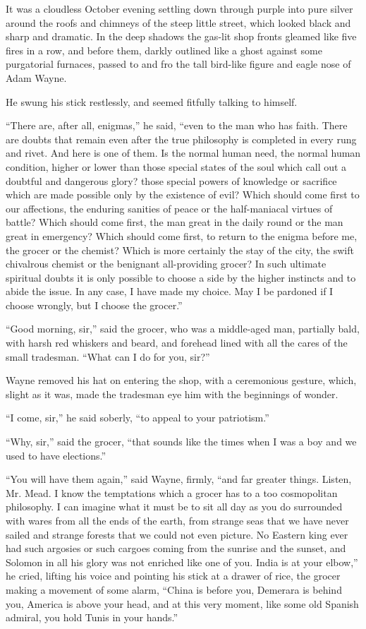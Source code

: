 \documentclass{book}
\begin{document}
It was a cloudless October evening settling down through purple into pure silver around the roofs and chimneys of the steep little street, which looked black and sharp and dramatic. In the deep shadows the gas-lit shop fronts gleamed like five fires in a row, and before them, darkly outlined like a ghost against some purgatorial furnaces, passed to and fro the tall bird-like figure and eagle nose of Adam Wayne.

He swung his stick restlessly, and seemed fitfully talking to himself.

“There are, after all, enigmas,” he said, “even to the man who has faith. There are doubts that remain even after the true philosophy is completed in every rung and rivet. And here is one of them. Is the normal human need, the normal human condition, higher or lower than those special states of the soul which call out a doubtful and dangerous glory? those special powers of knowledge or sacrifice which are made possible only by the existence of evil? Which should come first to our affections, the enduring sanities of peace or the half-maniacal virtues of battle? Which should come first, the man great in the daily round or the man great in emergency? Which should come first, to return to the enigma before me, the grocer or the chemist? Which is more certainly the stay of the city, the swift chivalrous chemist or the benignant all-providing grocer? In such ultimate spiritual doubts it is only possible to choose a side by the higher instincts and to abide the issue. In any case, I have made my choice. May I be pardoned if I choose wrongly, but I choose the grocer.”

“Good morning, sir,” said the grocer, who was a middle-aged man, partially bald, with harsh red whiskers and beard, and forehead lined with all the cares of the small tradesman. “What can I do for you, sir?”

Wayne removed his hat on entering the shop, with a ceremonious gesture, which, slight as it was, made the tradesman eye him with the beginnings of wonder.

“I come, sir,” he said soberly, “to appeal to your patriotism.”

“Why, sir,” said the grocer, “that sounds like the times when I was a boy and we used to have elections.”

“You will have them again,” said Wayne, firmly, “and far greater things. Listen, Mr. Mead. I know the temptations which a grocer has to a too cosmopolitan philosophy. I can imagine what it must be to sit all day as you do surrounded with wares from all the ends of the earth, from strange seas that we have never sailed and strange forests that we could not even picture. No Eastern king ever had such argosies or such cargoes coming from the sunrise and the sunset, and Solomon in all his glory was not enriched like one of you. India is at your elbow,” he cried, lifting his voice and pointing his stick at a drawer of rice, the grocer making a movement of some alarm, “China is before you, Demerara is behind you, America is above your head, and at this very moment, like some old Spanish admiral, you hold Tunis in your hands.”
\end{document}
